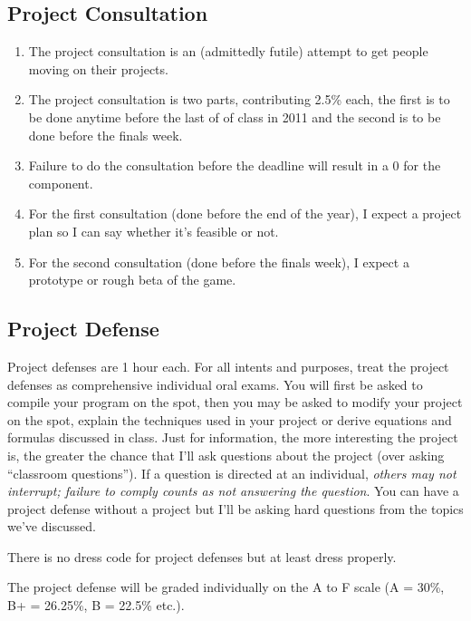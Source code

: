 \documentclass[10pt]{article}
\begin{document}
\subsection{Project Consultation}
\begin{enumerate}[noitemsep]
\item The project consultation is an (admittedly futile) attempt to get people moving on their projects.
\item The project consultation is two parts, contributing 2.5\% each, the first is to be done anytime before the last of of class in 2011 and the second is to be done before the finals week.
\item Failure to do the consultation before the deadline will result in a 0 for the component.
\item For the first consultation (done before the end of the year), I expect a project plan so I can say whether it's feasible or not.
\item For the second consultation (done before the finals week), I expect a prototype or rough beta of the game.
\end{enumerate}

\subsection{Project Defense}
Project defenses are 1 hour each. For all intents and purposes, treat the project defenses as comprehensive individual oral exams. You will first be asked to compile your program on the spot, then you may be asked to modify your project on the spot, explain the techniques used in your project or derive equations and formulas discussed in class. Just for information, the more interesting the project is, the greater the chance that I'll ask questions about the project (over asking ``classroom questions''). If a question is directed at an individual, \emph{others may not interrupt; failure to comply counts as not answering the question}. You can have a project defense without a project but I'll be asking hard questions from the topics we've discussed.

There is no dress code for project defenses but at least dress properly.

The project defense will be graded individually on the A to F scale (A = 30\%, B+ = 26.25\%, B = 22.5\% etc.).
\end{document}
